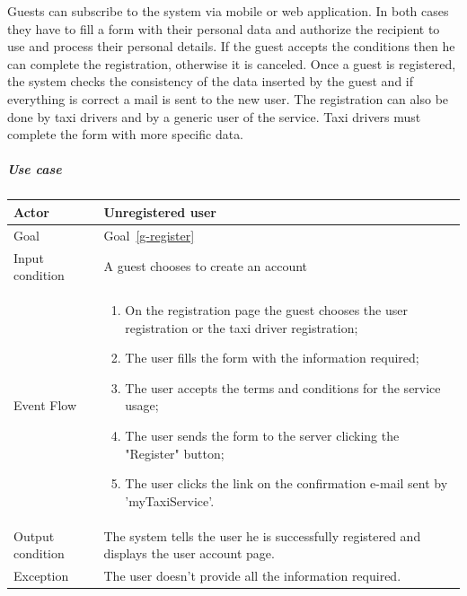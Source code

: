 Guests can subscribe to the system via mobile or web application. In both cases they have to fill a form with their personal data and authorize the recipient to use and process their personal details.
If the guest accepts the conditions then he can complete the registration, otherwise it is canceled.
Once a guest is registered, the system checks the consistency of the data inserted by the guest and if everything is correct a mail is sent to the new user. \newline
The registration can also be done by taxi drivers and by a generic user of the service. Taxi drivers must complete the form with more specific data.

\subparagraph{Use case}
\noindent
    \begin{center}
        \begin{longtable}{| l | p{} |}
            \hline
            Actor & Unregistered user \\
            \hline
            Goal & Goal~\ref{g-register}
            \\
            \hline
            Input condition & A guest chooses to create an account  \\
            \hline
            Event Flow & 
                \begin{enumerate}
                	\item On the registration page the guest chooses the user registration or the taxi driver registration;
                	\item The user fills the form with the information required;
                	\item The user accepts the terms and conditions for the service usage;
                	\item The user sends the form to the server clicking the "Register" button;
                	\item The user clicks the link on the confirmation e-mail sent by 'myTaxiService'.
            	\end{enumerate}
            \\
            \hline
            Output condition & The system tells the user he is successfully registered and displays the user account page. \\
            \hline
            Exception & The user doesn't provide all the information required. \\
            \hline
        \end{longtable}
    \end{center}

